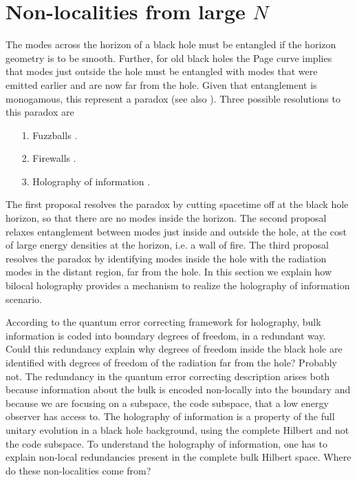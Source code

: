 \documentclass[a4paper,12pt]{article}
\begin{document}
\section{Non-localities from large $N$}\label{HI}

The modes across the horizon of a black hole must be entangled if the horizon geometry is to be smooth.
Further, for old black holes the Page curve implies that modes just outside the hole must be entangled with
modes that were emitted earlier and are now far from the hole. 
Given that entanglement is monogamous, this represent a paradox \cite{Almheiri:2012rt,Almheiri:2013hfa,Marolf:2013dba} 
(see also \cite{Mathur:2009hf}).
Three possible resolutions to this paradox are
%
\begin{itemize}
\item[1.] Fuzzballs \cite{Mathur:2005zp,Skenderis:2008qn,Mathur:2012jk,Avery:2012tf}.
\item[2.] Firewalls \cite{Almheiri:2012rt,Almheiri:2013hfa,Marolf:2013dba}.
\item[3.] Holography of information \cite{Papadodimas:2012aq}.
\end{itemize}
%
The first proposal resolves the paradox by cutting spacetime off at the black hole horizon, so that there are no modes 
inside the horizon.
The second proposal relaxes entanglement between modes just inside and outside the hole, at the cost of large energy 
densities at the horizon, i.e. a wall of fire.
The third proposal resolves the paradox by identifying modes inside the hole with the radiation modes 
in the distant region, far from the hole.
In this section we explain how bilocal holography provides a mechanism to realize the holography of information scenario.
 
According to the quantum error correcting framework for holography, bulk information is coded into boundary degrees 
of freedom, in a redundant way.
Could this redundancy explain why degrees of freedom inside the black hole are identified with degrees of freedom
of the radiation far from the hole?
Probably not.
The redundancy in the quantum error correcting description arises both because information about the bulk is encoded non-locally
into the boundary and because we are focusing on a subspace, the code subspace, that a low energy observer has access to.
The holography of information is a property of the full unitary evolution in a black hole background, using the complete Hilbert 
and not the code subspace.
To understand the holography of information, one has to explain non-local redundancies present in the complete bulk 
Hilbert space.
Where do these non-localities come from?
\end{document}
